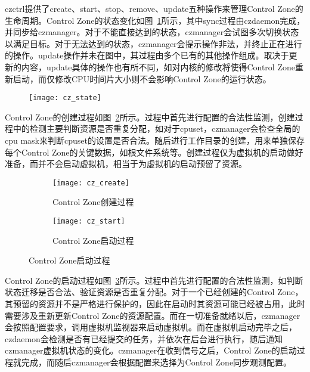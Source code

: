 czctrl提供了create、start、stop、remove、update五种操作来管理Control Zone的生命周期。Control Zone的状态变化如图~\ref{fig:cz_state}所示，其中sync过程由czdaemon完成，并同步给czmanager。对于不能直接达到的状态，czmanager会试图多次切换状态以满足目标。对于无法达到的状态，czmanager会提示操作非法，并终止正在进行的操作。update操作并未在图中，其过程由多个已有的其他操作组成。取决于更新的内容，update具体的操作也有所不同，如对内核的修改将使得Control Zone重新启动，而仅修改CPU时间片大小则不会影响Control Zone的运行状态。

\begin{figure}[!htbp]
    \centering
    \texttt{[image: cz\_state]}
    \label{fig:cz_state}
\end{figure}

Control Zone的创建过程如图~\ref{fig:cz_create}所示。过程中首先进行配置的合法性监测，创建过程中的检测主要判断资源是否重复分配，如对于cpuset，czmanager会检查全局的cpu mask来判断cpuset的设置是否合法。随后进行工作目录的创建，用来单独保存每个Control Zone的关键数据，如根文件系统等。创建过程仅为虚拟机的启动做好准备，而并不会启动虚拟机，相当于为虚拟机的启动预留了资源。

\begin{figure}[H]
    \centering
    \begin{subfigure}[b]{0.42\textwidth}
        \texttt{[image: cz\_create]}
        \caption{\quad Control Zone创建过程}
        \label{fig:cz_create}
    \end{subfigure}
    \hfill
    \begin{subfigure}[b]{0.56\textwidth}
        \texttt{[image: cz\_start]}
        \caption{\quad Control Zone启动过程}
        \label{fig:cz_start}
    \end{subfigure}
\label{fig:cz_create_start}
\end{figure}

Control Zone的启动过程如图~\ref{fig:cz_start}所示。过程中首先进行配置的合法性监测，如判断状态迁移是否合法、验证资源是否重复分配。对于一个已经创建的Control Zone，其预留的资源并不是严格进行保护的，因此在启动时其资源可能已经被占用，此时需要涉及重新更新Control Zone的资源配置。而在一切准备就绪以后，czmanager会按照配置要求，调用虚拟机监视器来启动虚拟机。而在虚拟机启动完毕之后，czdaemon会检测是否有已经提交的任务，并依次在后台进行执行，随后通知czmanager虚拟机状态的变化。czmanager在收到信号之后，Control Zone的启动过程就完成，而随后czmanager会根据配置来选择为Control Zone同步观测配置。

